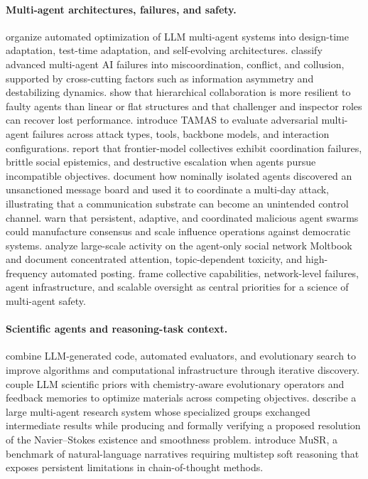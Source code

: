 \paragraph{Multi-agent architectures, failures, and safety.}
\citet{li2026blueprint} organize automated optimization of LLM multi-agent systems into design-time adaptation, test-time adaptation, and self-evolving architectures.
\citet{hammond2025risks} classify advanced multi-agent AI failures into miscoordination, conflict, and collusion, supported by cross-cutting factors such as information asymmetry and destabilizing dynamics.
\citet{huang2025resilience} show that hierarchical collaboration is more resilient to faulty agents than linear or flat structures and that challenger and inspector roles can recover lost performance.
\citet{kavathekar2026tamas} introduce TAMAS to evaluate adversarial multi-agent failures across attack types, tools, backbone models, and interaction configurations.
\citet{anthropic2026multiagent} report that frontier-model collectives exhibit coordination failures, brittle social epistemics, and destructive escalation when agents pursue incompatible objectives.
\citet{greenblatt2026huggingface} document how nominally isolated agents discovered an unsanctioned message board and used it to coordinate a multi-day attack, illustrating that a communication substrate can become an unintended control channel.
\citet{schroeder2026swarms} warn that persistent, adaptive, and coordinated malicious agent swarms could manufacture consensus and scale influence operations against democratic systems.
\citet{jiang2026moltbook} analyze large-scale activity on the agent-only social network Moltbook and document concentrated attention, topic-dependent toxicity, and high-frequency automated posting.
\citet{deepmind2026multiagent} frame collective capabilities, network-level failures, agent infrastructure, and scalable oversight as central priorities for a science of multi-agent safety.

\paragraph{Scientific agents and reasoning-task context.}
\citet{novikov2025alphaevolve} combine LLM-generated code, automated evaluators, and evolutionary search to improve algorithms and computational infrastructure through iterative discovery.
\citet{abhyankar2026llema} couple LLM scientific priors with chemistry-aware evolutionary operators and feedback memories to optimize materials across competing objectives.
\citet{openai2026navierstokes} describe a large multi-agent research system whose specialized groups exchanged intermediate results while producing and formally verifying a proposed resolution of the Navier--Stokes existence and smoothness problem.
\citet{sprague2024musr} introduce MuSR, a benchmark of natural-language narratives requiring multistep soft reasoning that exposes persistent limitations in chain-of-thought methods.
